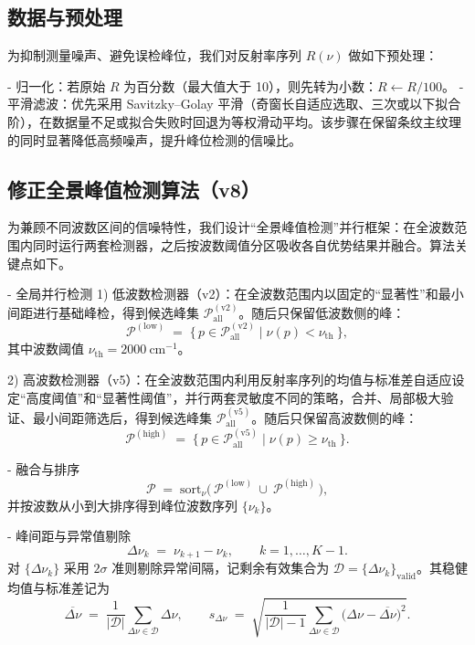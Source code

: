 \documentclass{ctexart} %
\begin{document}
\subsection{数据与预处理}
为抑制测量噪声、避免误检峰位，我们对反射率序列 \(R(\nu)\) 做如下预处理：

- 归一化：若原始 \(R\) 为百分数（最大值大于 10），则先转为小数：\(R\leftarrow R/100\)。
- 平滑滤波：优先采用 Savitzky–Golay 平滑（奇窗长自适应选取、三次或以下拟合阶），在数据量不足或拟合失败时回退为等权滑动平均。该步骤在保留条纹主纹理的同时显著降低高频噪声，提升峰位检测的信噪比。

\subsection{修正全景峰值检测算法（v8）}
为兼顾不同波数区间的信噪特性，我们设计“全景峰值检测”并行框架：在全波数范围内同时运行两套检测器，之后按波数阈值分区吸收各自优势结果并融合。算法关键点如下。

- 全局并行检测
1) 低波数检测器（v2）：在全波数范围内以固定的“显著性”和最小间距进行基础峰检，得到候选峰集 \(\mathcal{P}_{\mathrm{all}}^{(\mathrm{v2})}\)。随后只保留低波数侧的峰：
\[
    \mathcal{P}^{(\mathrm{low})} \;=\; \{\,p\in\mathcal{P}_{\mathrm{all}}^{(\mathrm{v2})} \mid \nu(p) < \nu_{\mathrm{th}}\ \},
\]
其中波数阈值 \(\nu_{\mathrm{th}}=2000~\mathrm{cm}^{-1}\)。

2) 高波数检测器（v5）：在全波数范围内利用反射率序列的均值与标准差自适应设定“高度阈值”和“显著性阈值”，并行两套灵敏度不同的策略，合并、局部极大验证、最小间距筛选后，得到候选峰集 \(\mathcal{P}_{\mathrm{all}}^{(\mathrm{v5})}\)。随后只保留高波数侧的峰：
\[
    \mathcal{P}^{(\mathrm{high})} \;=\; \{\,p\in\mathcal{P}_{\mathrm{all}}^{(\mathrm{v5})} \mid \nu(p) \ge \nu_{\mathrm{th}}\ \}.
\]

- 融合与排序
\[
    \mathcal{P} \;=\; \mathrm{sort}_\nu\big(\,\mathcal{P}^{(\mathrm{low})}\ \cup\ \mathcal{P}^{(\mathrm{high})}\,\big),
\]
并按波数从小到大排序得到峰位波数序列 \(\{\nu_k\}\)。

- 峰间距与异常值剔除
\[
    \Delta\nu_k \;=\; \nu_{k+1}-\nu_k,\qquad k=1,\dots, K-1.
\]
对 \(\{\Delta\nu_k\}\) 采用 \(2\sigma\) 准则剔除异常间隔，记剩余有效集合为 \(\mathcal{D}=\{\Delta\nu_k\}_{\mathrm{valid}}\)。其稳健均值与标准差记为
\[
    \overline{\Delta\nu} \;=\; \frac{1}{|\mathcal{D}|}\sum_{\Delta\nu\in\mathcal{D}} \Delta\nu,\qquad
    s_{\Delta\nu} \;=\; \sqrt{\frac{1}{|\mathcal{D}|-1}\sum_{\Delta\nu\in\mathcal{D}}\big(\Delta\nu-\overline{\Delta\nu}\big)^2}.
\]
\end{document}
